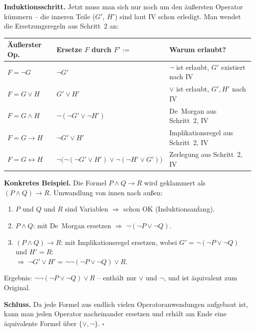 \documentclass[a4paper,12pt]{article}
\begin{document}
\medskip
\textbf{Induktionsschritt.}
Jetzt muss man sich nur noch um den \"au\ss ersten Operator
k\"ummern -- die inneren Teile ($G'$, $H'$) sind laut IV schon
erledigt. Man wendet die Ersetzungsregeln aus Schritt~2 an:

\begin{center}
\renewcommand{\arraystretch}{1.4}
\begin{tabular}{l|l|l}
\toprule
\textbf{\"Au\ss erster Op.} & \textbf{Ersetze $F$ durch $F' :=$}
  & \textbf{Warum erlaubt?} \\
\midrule
$F = \neg G$
  & $\neg G'$
  & $\neg$ ist erlaubt, $G'$ existiert nach IV \\
$F = G \vee H$
  & $G' \vee H'$
  & $\vee$ ist erlaubt, $G', H'$ nach IV \\
$F = G \wedge H$
  & $\neg(\neg G' \vee \neg H')$
  & De~Morgan aus Schritt~2, IV \\
$F = G \to H$
  & $\neg G' \vee H'$
  & Implikationsregel aus Schritt~2, IV \\
$F = G \leftrightarrow H$
  & $\neg\bigl(\neg(\neg G' \vee H') \vee \neg(\neg H' \vee G')\bigr)$
  & Zerlegung aus Schritt~2, IV \\
\bottomrule
\end{tabular}
\end{center}

\textbf{Konkretes Beispiel.} Die Formel $P \wedge Q \to R$
wird geklammert als $(P \wedge Q) \to R$. Umwandlung von innen
nach au\ss en:

\begin{enumerate}[nosep]
\item $P$ und $Q$ und $R$ sind Variablen $\Rightarrow$ schon OK
      (Induktionsanfang).
\item $P \wedge Q$: mit De~Morgan ersetzen $\Rightarrow$
      $\neg(\neg P \vee \neg Q)$.
\item $(P \wedge Q) \to R$: mit Implikationsregel ersetzen,
      wobei $G' = \neg(\neg P \vee \neg Q)$ und $H' = R$:\\
      $\Rightarrow\; \neg G' \vee H'
      = \neg\neg(\neg P \vee \neg Q) \vee R$.
\end{enumerate}

Ergebnis: $\neg\neg(\neg P \vee \neg Q) \vee R$ -- enth\"alt nur
$\vee$ und $\neg$, und ist \"aquivalent zum Original. \checkmark

\medskip
\textbf{Schluss.} Da jede Formel aus endlich vielen
Operatoranwendungen aufgebaut ist, kann man jeden Operator
nacheinander ersetzen und erh\"alt am Ende eine \"aquivalente
Formel \"uber $\{\vee, \neg\}$.
\hfill$\square$
\end{document}
